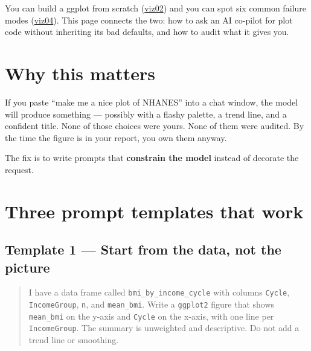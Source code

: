 \documentclass[
  letterpaper,
  DIV=11,
  numbers=noendperiod,
  oneside]{scrreprt}
\begin{document}

You can build a ggplot from scratch
(\hyperref[grammar-of-a-ggplot-and-your-first-plot]{viz02}) and you can
spot six common failure modes
(\hyperref[how-a-plot-can-mislead]{viz04}). This page connects the two:
how to ask an AI co-pilot for plot code without inheriting its bad
defaults, and how to audit what it gives you.

\section*{Why this matters}\label{why-this-matters-1}


If you paste ``make me a nice plot of NHANES'' into a chat window, the
model will produce something --- possibly with a flashy palette, a trend
line, and a confident title. None of those choices were yours. None of
them were audited. By the time the figure is in your report, you own
them anyway.

The fix is to write prompts that \textbf{constrain the model} instead of
decorate the request.

\section*{Three prompt templates that
work}\label{three-prompt-templates-that-work}


\subsection*{Template 1 --- Start from the data, not the
picture}\label{template-1-start-from-the-data-not-the-picture}

\begin{quote}
I have a data frame called \texttt{bmi\_by\_income\_cycle} with columns
\texttt{Cycle}, \texttt{IncomeGroup}, \texttt{n}, and
\texttt{mean\_bmi}. Write a \texttt{ggplot2} figure that shows
\texttt{mean\_bmi} on the y-axis and \texttt{Cycle} on the x-axis, with
one line per \texttt{IncomeGroup}. The summary is unweighted and
descriptive. Do not add a trend line or smoothing.
\end{quote}
\end{document}
